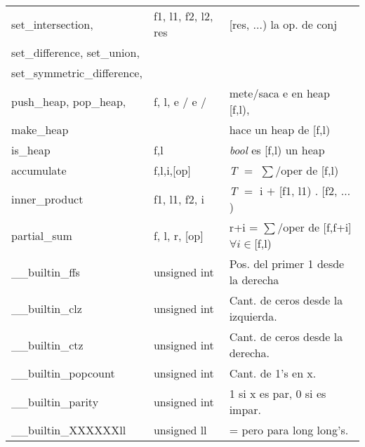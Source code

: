 \begin{tabular}{|l|l|p{5.4cm}|}
set\_intersection, & f1, l1, f2, l2, res & [res, $\ldots$) la op. de conj\\
set\_difference, set\_union, & & \\
set\_symmetric\_difference, & &\\\hline
push\_heap, pop\_heap, & f, l, e / e / & mete/saca e en heap [f,l), \\
make\_heap & & hace un heap de [f,l)\\\hline
is\_heap & f,l & \textit{bool} es [f,l) un heap\\\hline
accumulate & f,l,i,[op] & \textit{T} $=$ $\sum$/oper de [f,l)\\\hline
inner\_product & f1, l1, f2, i & \textit{T} $=$ i $+$ [f1, l1) . [f2, $\ldots$ )\\\hline
partial\_sum & f, l, r, [op] & r+i = $\sum$/oper de [f,f+i] $\forall i \in$[f,l)\\\hline
\_\_builtin\_ffs& unsigned int & Pos. del primer 1 desde la derecha\\\hline
\_\_builtin\_clz & unsigned int & Cant. de ceros desde la izquierda.\\\hline
\_\_builtin\_ctz & unsigned int & Cant. de ceros desde la derecha.\\\hline
\_\_builtin\_popcount & unsigned int & Cant. de 1’s en x.\\\hline
\_\_builtin\_parity & unsigned int & 1 si x es par, 0 si es impar.\\\hline
\_\_builtin\_XXXXXXll & unsigned ll & = pero para long long's.\\\hline
\end{tabular}\newpage
